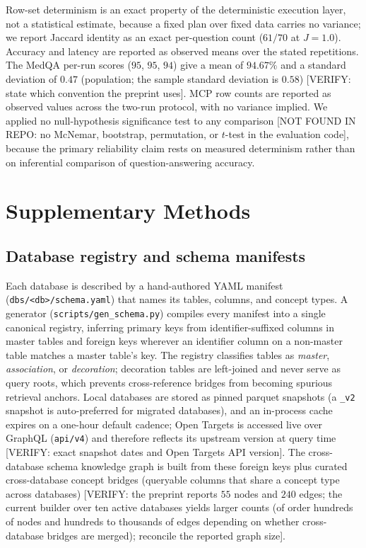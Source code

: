 Row-set determinism is an exact property of the deterministic execution layer, not a statistical estimate, because a fixed plan over fixed data carries no variance; we report Jaccard identity as an exact per-question count ($61/70$ at $J = 1.0$). Accuracy and latency are reported as observed means over the stated repetitions. The MedQA per-run scores ($95$, $95$, $94$) give a mean of $94.67\%$ and a standard deviation of $0.47$ (population; the sample standard deviation is $0.58$) [VERIFY: state which convention the preprint uses]. MCP row counts are reported as observed values across the two-run protocol, with no variance implied. We applied no null-hypothesis significance test to any comparison [NOT FOUND IN REPO: no McNemar, bootstrap, permutation, or $t$-test in the evaluation code], because the primary reliability claim rests on measured determinism rather than on inferential comparison of question-answering accuracy.



\section*{Supplementary Methods}

\subsection*{Database registry and schema manifests}

Each database is described by a hand-authored YAML manifest (\texttt{dbs/<db>/schema.yaml}) that names its tables, columns, and concept types. A generator (\texttt{scripts/gen\_schema.py}) compiles every manifest into a single canonical registry, inferring primary keys from identifier-suffixed columns in master tables and foreign keys wherever an identifier column on a non-master table matches a master table's key. The registry classifies tables as \textit{master}, \textit{association}, or \textit{decoration}; decoration tables are left-joined and never serve as query roots, which prevents cross-reference bridges from becoming spurious retrieval anchors. Local databases are stored as pinned parquet snapshots (a \texttt{\_v2} snapshot is auto-preferred for migrated databases), and an in-process cache expires on a one-hour default cadence; Open Targets is accessed live over GraphQL (\texttt{api/v4}) and therefore reflects its upstream version at query time [VERIFY: exact snapshot dates and Open Targets API version]. The cross-database schema knowledge graph is built from these foreign keys plus curated cross-database concept bridges (queryable columns that share a concept type across databases) [VERIFY: the preprint reports $55$ nodes and $240$ edges; the current builder over ten active databases yields larger counts (of order hundreds of nodes and hundreds to thousands of edges depending on whether cross-database bridges are merged); reconcile the reported graph size].

